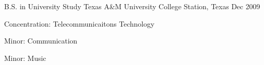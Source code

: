 

\begin{cventries}

  \cventry
    {B.S. in University Study} %
    {Texas A\&M University} %
    {College Station, Texas} %
    {Dec 2009} %
    {
      \begin{cvitems}
          \item {Concentration: Telecommunicaitons Technology} %
          \item {Minor: Communication} %
          \item {Minor: Music} %
      \end{cvitems}
    }

\end{cventries}
